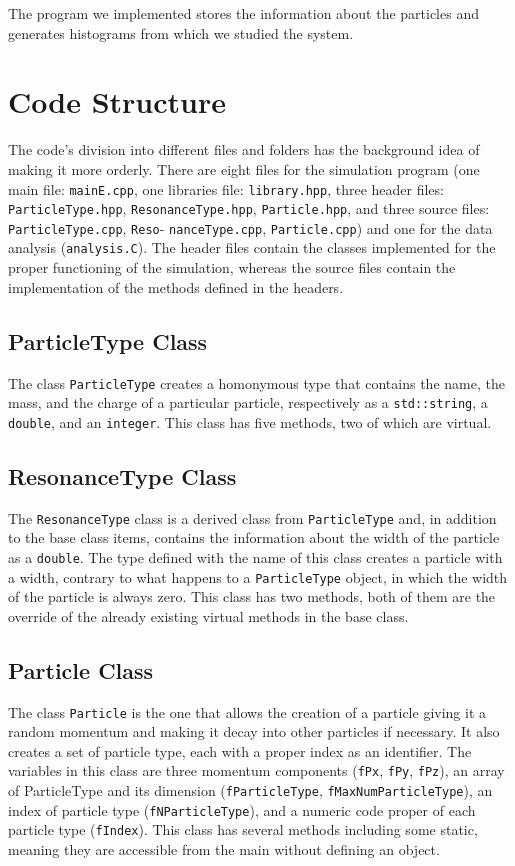 \documentclass[a4paper, 11pt]{article}
\begin{document}
    The program we implemented stores the information about the particles and generates histograms from which we studied the system.
    \section{Code Structure}
      The code's division into different files and folders has the background idea of making it more orderly. There are eight files for the simulation program (one main file: \verb|mainE.cpp|, one libraries file: \verb|library.hpp|, three header files: \verb|ParticleType.hpp|, \verb|ResonanceType.hpp|, \verb|Particle.hpp|, and three source files: \verb|ParticleType.cpp|, \verb|Reso|- \verb|nanceType.cpp|, \verb|Particle.cpp|) and one for the data analysis (\verb|analysis.C|).
      The header files contain the classes implemented for the proper functioning of the simulation, whereas the source files contain the implementation of the methods defined in the headers.
      \subsection*{ParticleType Class}
      The class \verb|ParticleType| creates a homonymous type that contains the name, the mass, and the charge of a particular particle, respectively as a \verb|std::string|, a \verb|double|, and an \verb|integer|. This class has five methods, two of which are virtual.
      \subsection* {ResonanceType Class}
      The \verb|ResonanceType| class is a derived class from \verb|ParticleType| and, in addition to the base class items, contains the information about the width of the particle as a \verb|double|. The type defined with the name of this class creates a particle with a width, contrary to what happens to a \verb|ParticleType| object, in which the width of the particle is always zero. This class has two methods, both of them are the override of the already existing virtual methods in the base class.
      \subsection* {Particle Class}
      The class \verb|Particle| is the one that allows the creation of a particle giving it a random momentum and making it decay into other particles if necessary. It also creates a set of particle type, each with a proper index as an identifier. The variables in this class are three momentum components (\verb|fPx|, \verb|fPy|, \verb|fPz|), an array of ParticleType and its dimension (\verb|fParticleType|, \verb|fMaxNumParticleType|), an index of particle type (\verb|fNParticleType|), and a numeric code proper of each particle type (\verb|fIndex|). This class has several methods including some static, meaning they are accessible from the main without defining an object.
\end{document}
